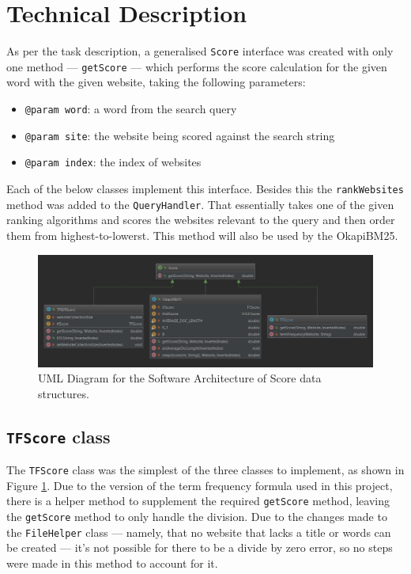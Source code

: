 \section{Technical Description}
As per the task description, a generalised {\tt Score} interface was created with only one method — {\tt getScore} — which performs the score calculation for the given word with the given website, taking the following parameters:
\begin{itemize}
    \item {\tt @param word}: a word from the search query
    \item {\tt @param site}: the website being scored against the search string
    \item {\tt @param index}: the index of websites
\end{itemize}
Each of the below classes implement this interface. Besides this the {\tt rankWebsites} method was added to the {\tt QueryHandler}. That essentially takes one of the given ranking algorithms and scores the websites relevant to the query and then order them from highest-to-lowerst. This method will also be used by the OkapiBM25.

\begin{figure}[t]
    \centering
    \includegraphics[width=\textwidth]{figures/diagram-score}
    \caption{UML Diagram for the Software Architecture of Score data structures.}
    \label{fig:score:uml}
\end{figure}

\subsection{{\tt TFScore} class}
The {\tt TFScore} class was the simplest of the three classes to implement, as shown in Figure \ref{fig:score:uml}.
Due to the version of the term frequency formula used in this project, there is a helper method to supplement the required {\tt getScore} method, leaving the {\tt getScore} method to only handle the division.
Due to the changes made to the {\tt FileHelper} class — namely, that no website that lacks a title or words can be created — it's not possible for there to be a divide by zero error, so no steps were made in this method to account for it.

